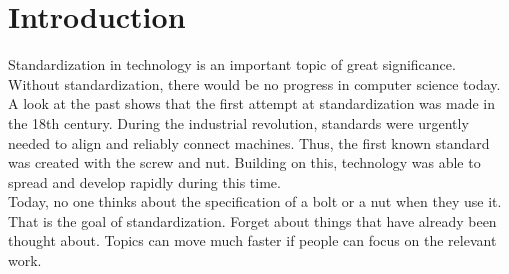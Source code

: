 \section{Introduction}
Standardization in technology is an important topic of great significance. Without standardization, there would be no progress in computer science today. \\
A look at the past shows that the first attempt at standardization was made in the 18th century. During the industrial revolution, standards were urgently needed to align and reliably connect machines. Thus, the first known standard was created with the screw and nut. Building on this, technology was able to spread and develop rapidly during this time. \cite{wiki_standardization_2022} \\
Today, no one thinks about the specification of a bolt or a nut when they use it. That is the goal of standardization. Forget about things that have already been thought about. Topics can move much faster if people can  focus on the relevant work. \\



%